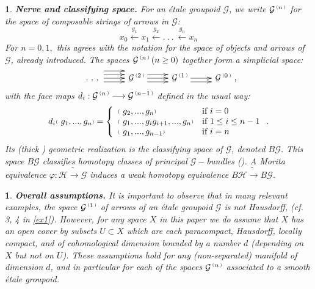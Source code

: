 \documentclass[a4paper]{article}
\newtheorem{num}[st]{}
\newcommand{\rmap}{\longrightarrow}
\newcommand{\Ha}{\ensuremath{\mathcal{H}}}
\newcommand{\G}{\ensuremath{\mathcal{G}}}
\newcommand{\ps}{{\raise 1pt\hbox{\tiny (}}}
\newcommand{\pd}{{\raise 1pt\hbox{\tiny )}}}
\newcommand{\nG}[1]{\ensuremath{\G^{\,\ps #1\,\pd}}}
\begin{document}
\begin{num}
\label{nerve}
\emph{
{\bf Nerve and classifying space.} For an \'etale groupoid $\G$, we write $\nG{n}$ for the space of composable strings of arrows in $\G$: 
\[ x_{0} \stackrel{g_{1}}{\longleftarrow} x_{1} \stackrel{g_{2}}{\longleftarrow} . \ . \ . \ \stackrel{g_{n}}{\longleftarrow} x_{n} \]
\hspace*{.3in} For $n= 0, 1,$ this agrees with the notation for the space of objects and arrows of $\G$, already introduced. The spaces $\nG{n}  \, (n \geq 0)$ together form a simplicial space:
\begin{equation}
\label{rel2}
 \xymatrix {
 \  .\ .\ .\ \ar@<2ex>[r]\ar@<1ex>[r]\ar[r]\ar@<-1ex>[r] & \, \nG{2} \ar@<1ex>[r]\ar[r]\ar@<-1ex>[r] & \, \nG{1} \ar[r]\ar@<-1ex>[r] & \, \nG{0} },
\end{equation}
with the face maps $d_{i}: \nG{n} \rmap \nG{n-1}$ defined in the usual way:
 \[ d_{i} \ps  \ g_{1},. . ., g_{n} \pd = \left \{ \begin{array}{ll} 
                                              \ps  \ g_{2}, . . . , g_{n} \pd & \mbox{if $i=0$} \\
                                              \ps  \ g_{1}, . . . , g_{i}g_{i+1}, . . . , g_{n} \pd & \mbox{if $1 \leq i \leq n-1$} \\
                                              \ps  \ g_{1}, ... , g_{n-1} \pd & \mbox{if $i=n$}
                                                        \end{array}
                                            \right. .\]
Its (thick \cite{Segal}) geometric realization is the classifying space of $\G$, denoted $B\G$. This space $B\G$ classifies homotopy classes of principal $\G-$bundles (\cite{BufLor, Fourier}). A Morita equivalence $\varphi : \Ha \tilde{\rmap} \G $ induces a weak homotopy equivalence $B\Ha \tilde{\rmap} B\G$.
}
\end{num}




\begin{num}
\label{assumptions}
\emph{
{\bf Overall assumptions.} It is important to observe that in many relevant examples, the space $\nG{1}$ of arrows of an \'etale groupoid $\G$ is not Hausdorff, (cf. 3, 4 in \ref{ex1}). However, for any space $X$ in this paper we do assume that $X$ has an open cover by subsets $U \subset X$ which are each paracompact, Hausdorff, locally compact, and of cohomological dimension bounded by a number $d$ (depending on $X$ but not on $U$). These assumptions hold for any (non-separated) manifold of dimension $d$, and in particular for each of the spaces $\nG{n}$ associated to a smooth \'etale groupoid.
}
\end{num}
\end{document}
